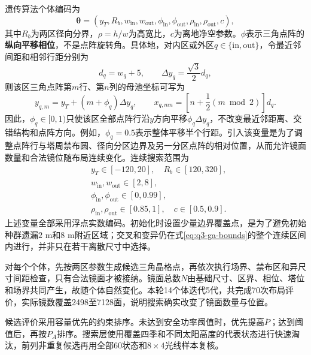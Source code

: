 遗传算法个体编码为
\begin{equation}
 \boldsymbol\theta=
 (y_T,R_b,w_{\mathrm{in}},w_{\mathrm{out}},
 \phi_{\mathrm{in}},\phi_{\mathrm{out}},
 \rho_{\mathrm{in}},\rho_{\mathrm{out}},c),
 \label{eq:q3-ga-vector}
\end{equation}
其中$R_b$为两区径向分界，$\rho=h/w$为高宽比，$c$为离地净空参数。$\phi$表示三角点阵的\textbf{纵向平移相位}，不是点阵旋转角。具体地，对内区或外区$q\in\{\mathrm{in},\mathrm{out}\}$，令最近邻间距和相邻行距分别为
\begin{equation}
 d_q=w_q+5,\qquad \Delta y_q=\frac{\sqrt{3}}{2}d_q,
\end{equation}
则该区三角点阵第$m$行、第$n$列的母池坐标可写为
\begin{equation}
 y_{q,m}=y_T+(m+\phi_q)\Delta y_q,\qquad
 x_{q,mn}=\left[n+\frac{1}{2}(m\bmod 2)\right]d_q.
 \label{eq:q3-lattice-phase}
\end{equation}
因此，$\phi_q\in[0,1)$只使该区全部点阵行沿$y$方向平移$\phi_q\Delta y_q$，不改变最近邻距离、交错结构和点阵方向。例如，$\phi_q=0.5$表示整体平移半个行距。引入该变量是为了调整点阵行与塔周禁布圆、径向分区边界及另一分区点阵的相对位置，从而允许镜面数量和合法镜位随布局连续变化。连续搜索范围为
\begin{equation}
\begin{aligned}
 &y_T\in[-120,20],\quad R_b\in[120,320],\\
 &w_{\mathrm{in}},w_{\mathrm{out}}\in[2,8],\\
 &\phi_{\mathrm{in}},\phi_{\mathrm{out}}\in[0,0.99],\\
 &\rho_{\mathrm{in}},\rho_{\mathrm{out}}\in[0.85,1],
 \quad c\in[0.5,0.9].
\end{aligned}
 \label{eq:q3-ga-bounds}
\end{equation}
上述变量全部采用浮点实数编码。初始化时设置少量边界覆盖点，是为了避免初始种群遗漏$2$ m和$8$ m附近区域；交叉和变异仍在式\eqref{eq:q3-ga-bounds}的整个连续区间内进行，并非只在若干离散尺寸中选择。

对每个个体，先按两区参数生成候选三角晶格点，再依次执行场界、禁布区和异尺寸间距检查，只有合法镜面才被接纳。镜面总数$N$由基础尺寸、区界、相位、塔位和场界共同产生，故随个体自然变化。本轮14个体迭代5代，共完成70次布局评价，实际镜数覆盖2498至7128面，说明搜索确实改变了镜面数量与位置。

候选评价采用容量优先的约束排序。未达到安全功率阈值时，优先提高$\overline P$；达到阈值后，再按$P_A$排序。搜索层使用覆盖四季和不同太阳高度的代表状态进行快速淘汰，前列非重复候选再用全部60状态和$8\times4$光线样本复核。

